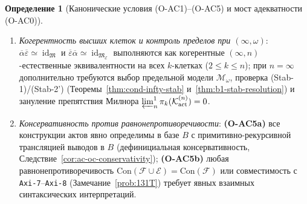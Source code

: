 \documentclass[11pt]{article}
\theoremstyle{plain}
\theoremstyle{definition}
\newtheorem{definition}[theorem]{Определение}
\newcommand{\cF}{\mathcal{F}}
\newcommand{\fM}{\mathfrak{M}}
\newcommand{\Con}{\mathrm{Con}}
\newcommand{\cE}{\mathcal{E}}
\DeclareMathOperator{\id}{id}
\begin{document}
\begin{definition}[Канонические условия \textup{(O-AC1)--(O-AC5)} и мост адекватности \textup{(O-AC0)}]
\begin{enumerate}[nosep,label=\textup{(O-AC\arabic*)},start=0]
\item \emph{Когерентность высших клеток и контроль пределов при $(\infty, \omega)$}: $\overline{\alpha}\overline{\varepsilon} \simeq \id_\fM$ и $\overline{\varepsilon}\overline{\alpha} \simeq \id_{\fM_\cE}$ выполняются как когерентные $(\infty, n)$-естественные эквивалентности на всех $k$-клетках ($2 \le k \le n$); при $n = \infty$ дополнительно требуются выбор предельной модели $\mathcal{M}_\omega$, проверка \textup{(Stab-1)}/\textup{(Stab-2')} (Теоремы~\ref{thm:cond-infty-stab} и~\ref{thm:b1-stab-resolution}) и зануление препятствия Милнора $\varprojlim^1_n \pi_k(\mathcal{K}_{\mathrm{act}}^{(n)}) = 0$.
\item \emph{Консервативность против равнонепротиворечивости}: \textup{\textbf{(O-AC5a)}} все конструкции актов явно определимы в базе $B$ с примитивно-рекурсивной трансляцией выводов в $B$ (дефинициальная консервативность, Следствие~\ref{cor:ac-oc-conservativity}); \textup{\textbf{(O-AC5b)}} любая равнонепротиворечивость $\Con(\cF \cup \cE) = \Con(\cF)$ или совместимость с \texttt{Axi-7}--\texttt{Axi-8} (Замечание~\ref{prob:131T}) требует явных взаимных синтаксических интерпретаций.
\end{enumerate}
\end{definition}
\end{document}
